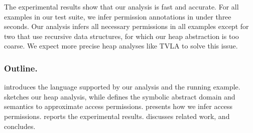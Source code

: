 \documentclass{llncs}
\begin{document}


The experimental results show that our analysis is fast and
accurate. For all examples in our test suite, we infer permission
annotations in under three seconds. Our analysis infers all
necessary permissions in all examples except for two that use
recursive data structures, for which our heap abstraction is too
coarse. We expect more precise heap analyses like TVLA \cite{SRW02}
to solve this issue.




\goup
\goup
\subsubsection{Outline.}

 introduces the language supported by our
analysis and the running example.  sketches
our heap analysis, while  defines the
symbolic abstract domain and semantics to approximate access
permissions.  presents how we infer access
permissions.   reports the
experimental results.   discusses related
work, and  concludes.




\goup
\end{document}
